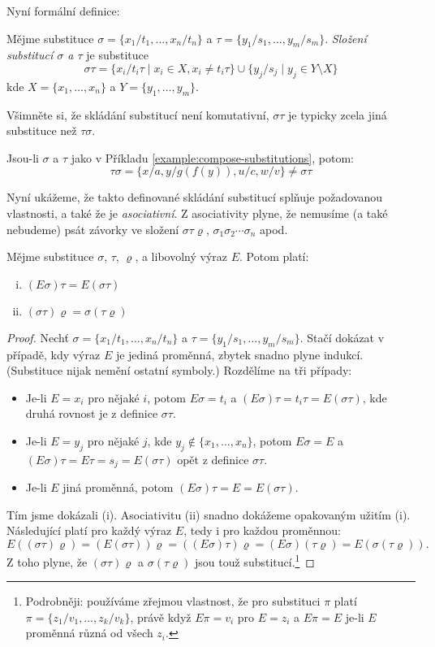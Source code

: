Nyní formální definice:

\begin{definition}
Mějme substituce $\sigma=\{x_1/t_1,\dots,x_n/t_n\}$ a $\tau=\{y_1/s_1,\dots,y_m/s_m\}$. \emph{Složení substitucí $\sigma$ a $\tau$} je substituce
$$
\sigma\tau=\{x_i/t_i\tau\mid x_i\in X,x_i\neq t_i\tau\}\cup\{y_j/s_j\mid y_j\in Y\setminus X\}
$$
kde $X=\{x_1,\dots,x_n\}$ a $Y=\{y_1,\dots,y_m\}$.
\end{definition}

Všimněte si, že skládání substitucí není komutativní, $\sigma\tau$ je typicky zcela jiná substituce než $\tau\sigma$.

\begin{example}
    Jsou-li $\sigma$ a $\tau$ jako v Příkladu \ref{example:compose-substitutions}, potom:
    $$
    \tau\sigma=\{x/a,y/g(f(y)),u/c,w/v\}\neq \sigma\tau
    $$
\end{example}

Nyní ukážeme, že takto definované skládání substitucí splňuje požadovanou vlastnosti, a také že je \emph{asociativní}. Z asociativity plyne, že nemusíme (a také nebudeme) psát závorky ve složení $\sigma\tau\varrho$, $\sigma_1\sigma_2\cdots\sigma_n$ apod.

\begin{proposition}
Mějme substituce $\sigma$, $\tau$, $\varrho$, a libovolný výraz $E$. Potom platí:
\begin{enumerate}[(i)]
    \item $(E\sigma)\tau=E(\sigma\tau)$
    \item $(\sigma\tau)\varrho=\sigma(\tau\varrho)$
\end{enumerate}
\end{proposition}

\begin{proof}
Nechť $\sigma=\{x_1/t_1,\dots,x_n/t_n\}$ a $\tau=\{y_1/s_1,\dots,y_m/s_m\}$. Stačí dokázat v případě, kdy výraz $E$ je jediná proměnná, zbytek snadno plyne indukcí. (Substituce nijak nemění ostatní symboly.) Rozdělíme na tři případy:
\begin{itemize}
    \item Je-li $E=x_i$ pro nějaké $i$, potom $E\sigma=t_i$ a $(E\sigma)\tau=t_i\tau=E(\sigma\tau)$, kde druhá rovnost je z definice $\sigma\tau$.
    \item Je-li $E=y_j$ pro nějaké $j$, kde $y_j\notin\{x_1,\dots,x_n\}$, potom $E\sigma=E$ a $(E\sigma)\tau=E\tau=s_j=E(\sigma\tau)$ opět z definice $\sigma\tau$.
    \item Je-li $E$ jiná proměnná, potom $(E\sigma)\tau=E=E(\sigma\tau)$.
\end{itemize}
Tím jsme dokázali (i). Asociativitu (ii) snadno dokážeme opakovaným užitím (i). Následující platí pro každý výraz $E$, tedy i pro každou proměnnou:
$$
E((\sigma\tau)\varrho)=(E(\sigma\tau))\varrho=((E\sigma)\tau)\varrho=(E\sigma)(\tau\varrho)=E(\sigma(\tau\varrho)).
$$
Z toho plyne, že $(\sigma\tau)\varrho$ a $\sigma(\tau\varrho)$ jsou touž substitucí.\footnote{Podrobněji: používáme zřejmou vlastnost, že pro substituci $\pi$ platí $\pi=\{z_1/v_1,\dots,z_k/v_k\}$, právě když $E\pi=v_i$ pro $E=z_i$  a $E\pi=E$ je-li $E$ proměnná různá od všech $z_i$.}
\end{proof}


